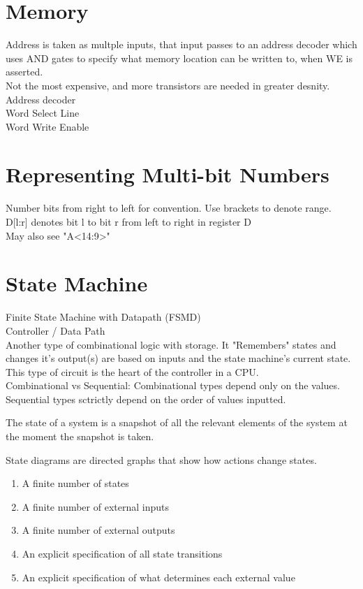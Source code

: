 \documentclass{article}
\begin{document}
\section{Memory}
Address is taken as multple inputs, that input passes to an address decoder which uses AND gates to specify what memory location can be written to, when WE is asserted.\\
Not the most expensive, and more transistors are needed in greater desnity.\\
Address decoder\\
Word Select Line\\
Word Write Enable

\section{Representing Multi-bit Numbers}
Number bits from right to left for convention. Use brackets to denote range.\\
D[l:r] denotes bit l to bit r from left to right in register D\\
May also see "A<14:9>"\\

\section{State Machine}
Finite State Machine with Datapath (FSMD)\\
Controller / Data Path\\
Another type of combinational logic with storage. It "Remembers" states and changes it's output(s) are based on inputs and the state machine's current state. This type of circuit is the heart of the controller in a CPU.\\

Combinational vs Sequential: Combinational types depend only on the values. Sequential types sctrictly depend on the order of values inputted.

The state of a system is a snapshot of all the relevant elements of the system at the moment the snapshot is taken.

State diagrams are directed graphs that show how actions change states.

\begin{enumerate}
  \item A finite number of states
  \item A finite number of external inputs
  \item A finite number of external outputs
  \item An explicit specification of all state transitions
  \item An explicit specification of what determines each external value
\end{enumerate}
\end{document}
